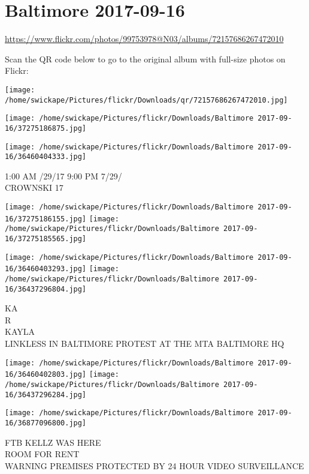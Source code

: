 \documentclass[10pt,letterpaper]{article}
\title{}
\author{}
\date{}
\begin{document}
\section*{Baltimore 2017-09-16}

\url{https://www.flickr.com/photos/99753978@N03/albums/72157686267472010}

Scan the QR code below to go to the original album with full-size photos on Flickr:

\texttt{[image: /home/swickape/Pictures/flickr/Downloads/qr/72157686267472010.jpg]}
\pagebreak

\texttt{[image: /home/swickape/Pictures/flickr/Downloads/Baltimore 2017-09-16/37275186875.jpg]}

\vspace{0.25in}
\texttt{[image: /home/swickape/Pictures/flickr/Downloads/Baltimore 2017-09-16/36460404333.jpg]}

1:00 AM /29/17 9:00 PM 7/29/\\
CROWNSKI 17
\pagebreak

\texttt{[image: /home/swickape/Pictures/flickr/Downloads/Baltimore 2017-09-16/37275186155.jpg]}
\texttt{[image: /home/swickape/Pictures/flickr/Downloads/Baltimore 2017-09-16/37275185565.jpg]}

\texttt{[image: /home/swickape/Pictures/flickr/Downloads/Baltimore 2017-09-16/36460403293.jpg]}
\texttt{[image: /home/swickape/Pictures/flickr/Downloads/Baltimore 2017-09-16/36437296804.jpg]}

KA\\
R\\
KAYLA\\
LINKLESS IN BALTIMORE PROTEST AT THE MTA BALTIMORE HQ
\pagebreak

\texttt{[image: /home/swickape/Pictures/flickr/Downloads/Baltimore 2017-09-16/36460402803.jpg]}
\texttt{[image: /home/swickape/Pictures/flickr/Downloads/Baltimore 2017-09-16/36437296284.jpg]}

\vspace{0.25in}
\texttt{[image: /home/swickape/Pictures/flickr/Downloads/Baltimore 2017-09-16/36877096800.jpg]}

FTB KELLZ WAS HERE\\
ROOM FOR RENT\\
WARNING PREMISES PROTECTED BY 24 HOUR VIDEO SURVEILLANCE
\pagebreak
\end{document}
